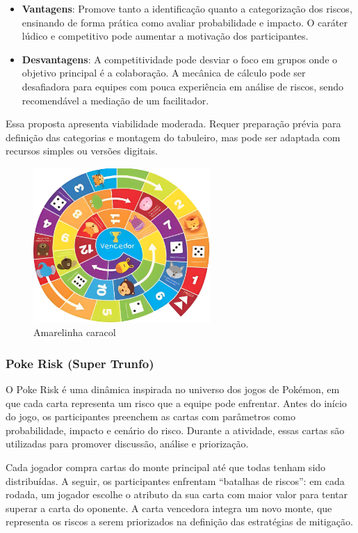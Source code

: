 \documentclass[
	12pt,
	openright,
	twoside,
	a4paper,
	english,
	brazil
	]{abntex2}
\begin{document}
\begin{itemize}
  \item \textbf{Vantagens}: Promove tanto a identificação quanto a categorização dos riscos, ensinando de forma prática como avaliar probabilidade e impacto. O caráter lúdico e competitivo pode aumentar a motivação dos participantes. 
  \item \textbf{Desvantagens}: A competitividade pode desviar o foco em grupos onde o objetivo principal é a colaboração. A mecânica de cálculo pode ser desafiadora para equipes com pouca experiência em análise de riscos, sendo recomendável a mediação de um facilitador. 
\end{itemize}

Essa proposta apresenta viabilidade moderada. Requer preparação prévia para definição das categorias e montagem do tabuleiro, mas pode ser adaptada com recursos simples ou versões digitais.

\begin{figure}[H]
  \centering
  \caption{\label{amarelinha}Amarelinha caracol}
  \includegraphics[width=0.6\textwidth]{amarelinha}
\end{figure}

\subsubsection{Poke Risk (Super Trunfo)}

O Poke Risk é uma dinâmica inspirada no universo dos jogos de Pokémon, em que cada carta representa um risco que a equipe pode enfrentar. Antes do início do jogo, os participantes preenchem as cartas com parâmetros como probabilidade, impacto e cenário do risco. Durante a atividade, essas cartas são utilizadas para promover discussão, análise e priorização.

Cada jogador compra cartas do monte principal até que todas tenham sido distribuídas. A seguir, os participantes enfrentam “batalhas de riscos”: em cada rodada, um jogador escolhe o atributo da sua carta com maior valor para tentar superar a carta do oponente. A carta vencedora integra um novo monte, que representa os riscos a serem priorizados na definição das estratégias de mitigação.
\end{document}
